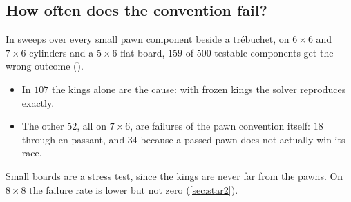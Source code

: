 \subsection{How often does the convention fail?}
In sweeps over every small pawn component beside a tr\'ebuchet, on $6\times6$ and $7\times6$ cylinders and a
$5\times6$ flat board, $159$ of $500$ testable components get the wrong outcome ().
\begin{itemize}
\item In $107$ the kings alone are the cause: with frozen kings the solver reproduces  exactly.
\item The other $52$, all on $7\times6$, are failures of the pawn convention itself: $18$ through en passant,
  and $34$ because a passed pawn does not actually win its race.
\end{itemize}
Small boards are a stress test, since the kings are never far from the pawns. On $8\times8$ the failure rate is
lower but not zero (\cref{sec:star2}).
